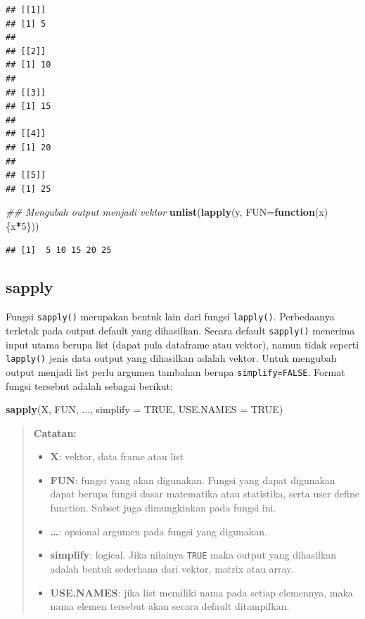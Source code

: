 \documentclass[]{book}
\newenvironment{Shaded}{\begin{snugshade}}{\end{snugshade}}
\newcommand{\CommentTok}[1]{\textcolor[rgb]{0.56,0.35,0.01}{\textit{#1}}}
\newcommand{\ControlFlowTok}[1]{\textcolor[rgb]{0.13,0.29,0.53}{\textbf{#1}}}
\newcommand{\DataTypeTok}[1]{\textcolor[rgb]{0.13,0.29,0.53}{#1}}
\newcommand{\DecValTok}[1]{\textcolor[rgb]{0.00,0.00,0.81}{#1}}
\newcommand{\KeywordTok}[1]{\textcolor[rgb]{0.13,0.29,0.53}{\textbf{#1}}}
\newcommand{\NormalTok}[1]{#1}
\newcommand{\OperatorTok}[1]{\textcolor[rgb]{0.81,0.36,0.00}{\textbf{#1}}}
\newcommand{\OtherTok}[1]{\textcolor[rgb]{0.56,0.35,0.01}{#1}}
\providecommand{\tightlist}{%
  \setlength{\itemsep}{0pt}\setlength{\parskip}{0pt}}
\theoremstyle{definition}
\theoremstyle{definition}
\theoremstyle{definition}
\theoremstyle{remark}
\begin{document}
\begin{verbatim}
## [[1]]
## [1] 5
## 
## [[2]]
## [1] 10
## 
## [[3]]
## [1] 15
## 
## [[4]]
## [1] 20
## 
## [[5]]
## [1] 25
\end{verbatim}

\begin{Shaded}
\begin{Highlighting}[]
\CommentTok{## Mengubah output menjadi vektor}
\KeywordTok{unlist}\NormalTok{(}\KeywordTok{lapply}\NormalTok{(y, }\DataTypeTok{FUN=}\ControlFlowTok{function}\NormalTok{(x)\{x}\OperatorTok{*}\DecValTok{5}\NormalTok{\}))}
\end{Highlighting}
\end{Shaded}

\begin{verbatim}
## [1]  5 10 15 20 25
\end{verbatim}

\hypertarget{sapply}{%
\subsection{sapply}\label{sapply}}

Fungsi \texttt{sapply()} merupakan bentuk lain dari fungsi \texttt{lapply()}. Perbedaanya terletak pada output default yang dihasilkan. Secara default \texttt{sapply()} menerima input utama berupa list (dapat pula dataframe atau vektor), namun tidak seperti \texttt{lapply()} jenis data output yang dihasilkan adalah vektor. Untuk mengubah output menjadi list perlu argumen tambahan berupa \texttt{simplify=FALSE}. Format fungsi tersebut adalah sebagai berikut:

\begin{Shaded}
\begin{Highlighting}[]
\KeywordTok{sapply}\NormalTok{(X, FUN, ..., }\DataTypeTok{simplify =} \OtherTok{TRUE}\NormalTok{, }\DataTypeTok{USE.NAMES =} \OtherTok{TRUE}\NormalTok{)}
\end{Highlighting}
\end{Shaded}

\begin{quote}
\textbf{Catatan:}

\begin{itemize}
\tightlist
\item
  \textbf{X}: vektor, data frame atau list
\item
  \textbf{FUN}: fungsi yang akan digunakan. Fungsi yang dapat digunakan dapat berupa fungsi dasar matematika atau statistika, serta user define function. Subset juga dimungkinkan pada fungsi ini.
\item
  \textbf{\ldots{}}: opsional argumen pada fungsi yang digunakan.
\item
  \textbf{simplify}: logical. Jika nilainya \texttt{TRUE} maka output yang dihasilkan adalah bentuk sederhana dari vektor, matrix atau array.
\item
  \textbf{USE.NAMES}: jika list memiliki nama pada setiap elemennya, maka nama elemen tersebut akan secara default ditampilkan.
\end{itemize}
\end{quote}
\end{document}
